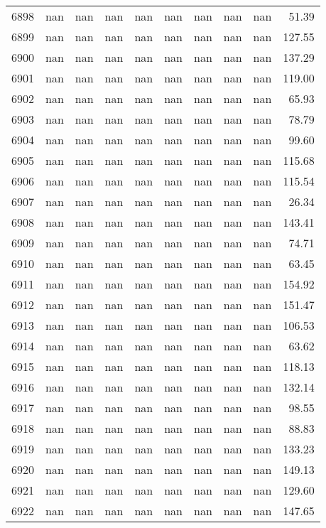 \begin{tabular}{lrrrrrrrrr}
6898 & nan & nan & nan & nan & nan & nan & nan & nan & 51.39 \\
6899 & nan & nan & nan & nan & nan & nan & nan & nan & 127.55 \\
6900 & nan & nan & nan & nan & nan & nan & nan & nan & 137.29 \\
6901 & nan & nan & nan & nan & nan & nan & nan & nan & 119.00 \\
6902 & nan & nan & nan & nan & nan & nan & nan & nan & 65.93 \\
6903 & nan & nan & nan & nan & nan & nan & nan & nan & 78.79 \\
6904 & nan & nan & nan & nan & nan & nan & nan & nan & 99.60 \\
6905 & nan & nan & nan & nan & nan & nan & nan & nan & 115.68 \\
6906 & nan & nan & nan & nan & nan & nan & nan & nan & 115.54 \\
6907 & nan & nan & nan & nan & nan & nan & nan & nan & 26.34 \\
6908 & nan & nan & nan & nan & nan & nan & nan & nan & 143.41 \\
6909 & nan & nan & nan & nan & nan & nan & nan & nan & 74.71 \\
6910 & nan & nan & nan & nan & nan & nan & nan & nan & 63.45 \\
6911 & nan & nan & nan & nan & nan & nan & nan & nan & 154.92 \\
6912 & nan & nan & nan & nan & nan & nan & nan & nan & 151.47 \\
6913 & nan & nan & nan & nan & nan & nan & nan & nan & 106.53 \\
6914 & nan & nan & nan & nan & nan & nan & nan & nan & 63.62 \\
6915 & nan & nan & nan & nan & nan & nan & nan & nan & 118.13 \\
6916 & nan & nan & nan & nan & nan & nan & nan & nan & 132.14 \\
6917 & nan & nan & nan & nan & nan & nan & nan & nan & 98.55 \\
6918 & nan & nan & nan & nan & nan & nan & nan & nan & 88.83 \\
6919 & nan & nan & nan & nan & nan & nan & nan & nan & 133.23 \\
6920 & nan & nan & nan & nan & nan & nan & nan & nan & 149.13 \\
6921 & nan & nan & nan & nan & nan & nan & nan & nan & 129.60 \\
6922 & nan & nan & nan & nan & nan & nan & nan & nan & 147.65 \\

\end{tabular}
